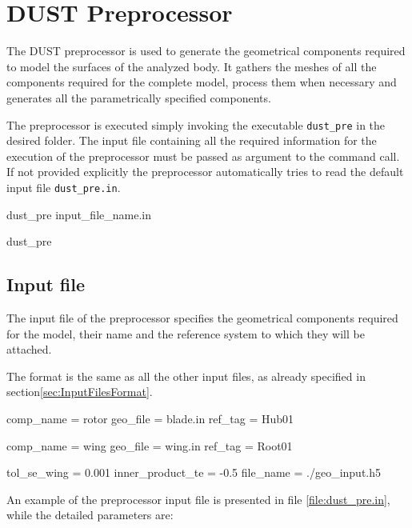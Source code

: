 \chapter{DUST Preprocessor}
\label{ch:Pre}

The DUST preprocessor is used to generate the geometrical components required to model 
the surfaces of the analyzed body. It gathers the meshes of all the components required 
for the complete model, process them when necessary and generates all the parametrically 
specified components. 

The preprocessor is executed simply invoking the executable \texttt{dust\_pre} in the desired folder. 
The input file containing all the required information for the execution of the preprocessor must be 
passed as argument to the command call. If not provided explicitly the preprocessor automatically 
tries to read the default input file \texttt{dust\_pre.in}.
\begin{command}[caption={Preprocessor command looking for input file \texttt{input\_file\_name.in}}]
  dust_pre input_file_name.in
\end{command}

\begin{command}[caption={Preprocessor command looking for 
default input file \texttt{dust\_pre.in}}, label={command:dus_pre_default}]
  dust_pre
\end{command}


\section{Input file}
\label{sec:Pre_InputFile}

The input file of the preprocessor specifies the geometrical components required 
for the model, their name and the reference system to which they will be attached.

The format is the same as all the other input files, as already specified in 
section\ref{sec:InputFilesFormat}.

\begin{inputfile}[frame=single, caption={dust_pre.in}, label={file:dust_pre.in}]
comp_name = rotor
geo_file  = blade.in
ref_tag   = Hub01

comp_name = wing
geo_file  = wing.in
ref_tag   = Root01

tol_se_wing  = 0.001
inner_product_te = -0.5
file_name = ./geo_input.h5 
\end{inputfile}

An example of the preprocessor input file is presented in file 
\ref{file:dust_pre.in}, while the detailed parameters are:

